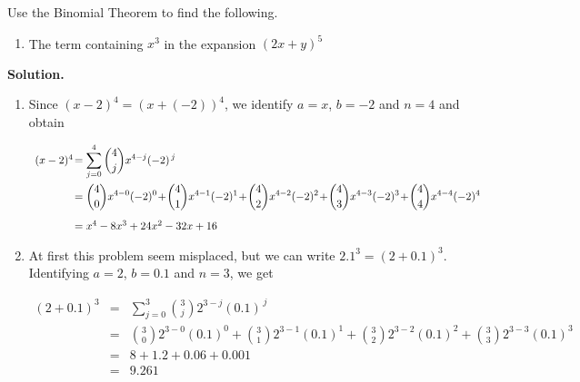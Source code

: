 \documentclass{ximera}
\begin{document}
\begin{ex} \label{binomialthmex}  Use the Binomial Theorem to find the following.

\begin{enumerate}


\item  The term containing $x^3$ in the expansion $(2x+y)^{5}$

\end{enumerate}

{\bf Solution.}
\begin{enumerate}
\item  Since $(x-2)^4 = (x+(-2))^4$, we identify $a = x$, $b = -2$ and $n=4$ and obtain

\[ \begin{array}{rcl}

(x-2)^4\! &\hspace{-.1in} =  & \hspace{-.1in}\displaystyle{\sum_{j=0}^{4} \binom{4}{j} x^{4-j} (-2)^{\, j}} \\ [15pt]
        & \hspace{-.1in} =  & \hspace{-.1in}\displaystyle{\binom{4}{0} x^{4-0} (-2)^{0} \!+\! \binom{4}{1} x^{4-1} (-2)^{1} \!+\! \binom{4}{2} x^{4-2} (-2)^{2} \!+\! \binom{4}{3} x^{4-3} (-2)^{3} \!+\! \binom{4}{4} x^{4-4} (-2)^{4}} \\ [15pt]
        &\hspace{-.1in}  =  & \hspace{-.1in}x^4 -8x^3 + 24x^2 - 32x + 16 \\
\end{array} \]

\item  At first this problem seem misplaced, but we can write $2.1^{3} = (2 + 0.1)^3$.  Identifying $a =2$, $b = 0.1$ and $n=3$, we get

\[ \begin{array}{rcl}

(2+0.1)^3 & = & \displaystyle{\sum_{j=0}^{3} \binom{3}{j} 2^{3-j} (0.1) ^{\, j}} \\ [15pt]
        & = & \displaystyle{\binom{3}{0} 2^{3-0}(0.1)^{0} + \binom{3}{1} 2^{3-1} (0.1)^{1} + \binom{3}{2} 2^{3-2}(0.1)^{2} + \binom{3}{3} 2^{3-3}(0.1)^{3}} \\ [15pt]
        & = & 8 + 1.2 + 0.06 + 0.001 \\
        & = & 9.261 \\
\end{array} \]


\end{enumerate}
\end{ex}
\end{document}
